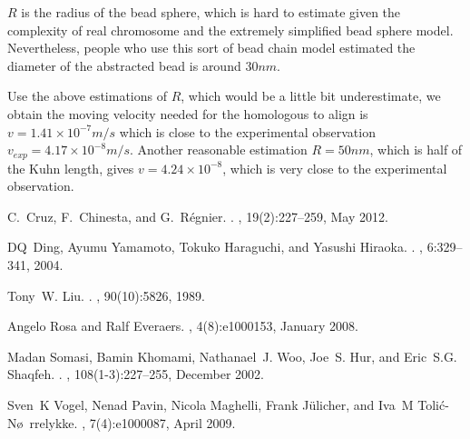 \documentclass{article}
\begin{document}
$R$ is the radius of the bead sphere, which is hard to estimate given the complexity of real chromosome and the extremely simplified bead sphere model.
Nevertheless, people who use this sort of bead chain model estimated the diameter of the abstracted bead is around $30nm$\cite{Rosa2008}.

Use the above estimations of $R$, which would be a little bit underestimate, we obtain the moving velocity needed for the homologous to align is $v = 1.41\times10^{-7} m/s$ which is close to the experimental observation $v_{exp} = 4.17\times10^{-8}m/s$.
Another reasonable estimation $R=50nm$, which is half of the Kuhn length, gives $v = 4.24\times10^{-8}$, which is very close to the experimental observation.


% 


\begin{thebibliography}{1}

C.~Cruz, F.~Chinesta, and G.~R\'{e}gnier.
.
,
  19(2):227--259, May 2012.

DQ~Ding, Ayumu Yamamoto, Tokuko Haraguchi, and Yasushi Hiraoka.
.
, 6:329--341, 2004.

Tony~W. Liu.
.
, 90(10):5826, 1989.

Angelo Rosa and Ralf Everaers.
, 4(8):e1000153, January 2008.

Madan Somasi, Bamin Khomami, Nathanael~J. Woo, Joe~S. Hur, and Eric~S.G.
  Shaqfeh.
.
, 108(1-3):227--255,
  December 2002.

Sven~K Vogel, Nenad Pavin, Nicola Maghelli, Frank J\"{u}licher, and Iva~M
  Toli\'{c}-N\o~rrelykke.
, 7(4):e1000087, April 2009.

\end{thebibliography}
\end{document}
